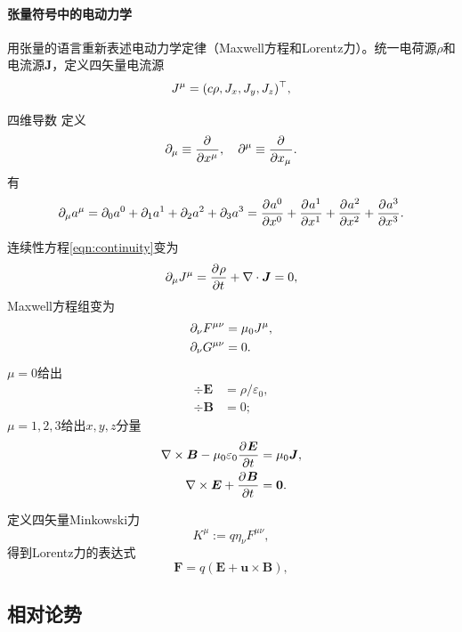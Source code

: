\paragraph{张量符号中的电动力学}
用张量的语言重新表述电动力学定律（Maxwell方程和Lorentz力）。统一电荷源$\rho$和电流源$\bm J$，定义四矢量电流源
\begin{equation}
    J^\mu=(c\rho,J_x,J_y,J_z)^\top,
\end{equation}
\begin{definition}{四维导数}{}
    定义 
    \begin{equation}
        \partial_\mu\equiv\frac{\partial^{{}}}{\partial{x^\mu}^{{}}},\quad\partial^\mu\equiv\frac{\partial^{{}}}{\partial{x_\mu}^{{}}}.
    \end{equation}
    有
    \begin{equation}
        \partial_\mu a^\mu=\partial_0a^0+\partial_1a^1+\partial_2a^2+\partial_3a^3=\frac{\partial^{{}}a^0}{\partial{x^0}^{{}}}+\frac{\partial^{{}}a^1}{\partial{x^1}^{{}}}+\frac{\partial^{{}}a^2}{\partial{x^2}^{{}}}+\frac{\partial^{{}}a^3}{\partial{x^3}^{{}}}.
    \end{equation}
\end{definition}
连续性方程\eqref{eqn:continuity}变为 
\[
    \partial_\mu J^\mu=\frac{\partial^{{}}\rho}{\partial{t}^{{}}}+\nabla\cdot\bm J=0,
\]
Maxwell方程组变为 
\begin{subequations}
    \begin{align}
        \partial_\nu F^{\mu\nu}&=\mu_0J^\mu,\\
        \partial_\nu G^{\mu\nu}&=0.
    \end{align}
\end{subequations}
$\mu=0$给出 
\begin{subequations}
    \begin{align}
        \div\bm E&=\rho/\varepsilon_0,\\
        \div\bm B&=0;
    \end{align}
\end{subequations}
$\mu=1,2,3$给出$x,y,z$分量 
\begin{subequations}
    \begin{align}
        \nabla\times\bm B-\mu_0\varepsilon_0\frac{\partial^{{}}\bm E}{\partial{t}^{{}}}&=\mu_0\bm J,\\
        \nabla\times\bm E+\frac{\partial^{{}}\bm B}{\partial{t}^{{}}}&=\bm0.
    \end{align}
\end{subequations}

定义四矢量Minkowski力 
\begin{equation}
    K^\mu:=q\eta_\nu F^{\mu\nu},
\end{equation}
得到Lorentz力的表达式
\[
    \bm F=q(\bm E+\bm u\times\bm B),
\]

\subsection{相对论势}

